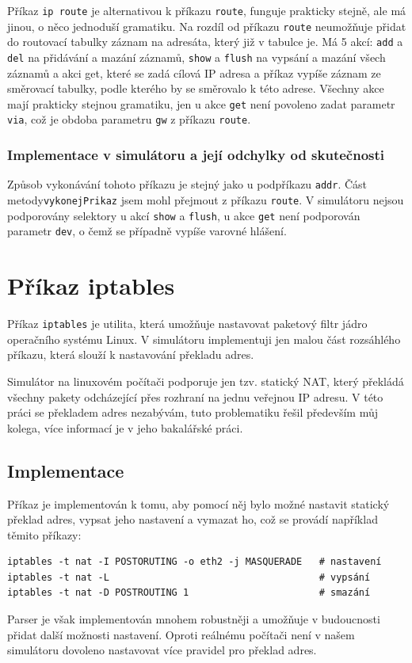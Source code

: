 Příkaz \verb|ip route| je alternativou k příkazu \verb|route|, funguje prakticky stejně, ale má jinou, o něco jednoduší gramatiku. Na rozdíl od příkazu \verb|route| neumožňuje přidat do routovací tabulky záznam na adresáta, který již v tabulce je. Má 5 akcí: \verb|add| a \verb|del| na přidávání a mazání záznamů, \verb|show| a \verb|flush| na vypsání a mazání všech záznamů a akci get, které se zadá cílová IP adresa a příkaz vypíše záznam ze směrovací tabulky, podle kterého by se směrovalo k této adrese. Všechny akce mají prakticky stejnou gramatiku, jen u akce \verb|get| není povoleno zadat parametr \verb|via|, což je obdoba parametru \verb|gw| z příkazu \verb|route|.

\subsubsection{Implementace v simulátoru a její odchylky od skutečnosti}

Způsob vykonávání tohoto příkazu je stejný jako u podpříkazu \verb|addr|. Část metody\linebreak \verb|vykonejPrikaz| jsem mohl přejmout z příkazu \verb|route|. V simulátoru nejsou podporovány selektory u akcí \verb|show| a \verb|flush|, u akce \verb|get| není podporován parametr \verb|dev|, o čemž se případně vypíše varovné hlášení.




\section{Příkaz iptables}

Příkaz \verb|iptables| je utilita, která umožňuje nastavovat paketový filtr jádro operačního systému Linux. V simulátoru implementuji jen malou část rozsáhlého příkazu, která slouží k nastavování překladu adres.

Simulátor na linuxovém počítači podporuje jen tzv. statický NAT, který překládá všechny pakety odcházející přes rozhraní na jednu veřejnou IP adresu. V této práci se překladem adres nezabývám, tuto problematiku řešil především můj kolega, více informací je v jeho bakalářské práci.


\subsection{Implementace}

Příkaz je implementován k tomu, aby pomocí něj bylo možné nastavit statický překlad adres, vypsat jeho nastavení a vymazat ho, což se provádí například těmito příkazy:
\begin{verbatim}
iptables -t nat -I POSTORUTING -o eth2 -j MASQUERADE   # nastavení
iptables -t nat -L                                     # vypsání
iptables -t nat -D POSTROUTING 1                       # smazání

\end{verbatim}
Parser je však implementován mnohem robustněji a umožňuje v budoucnosti přidat další možnosti nastavení. Oproti reálnému počítači není v našem simulátoru dovoleno nastavovat více pravidel pro překlad adres.
